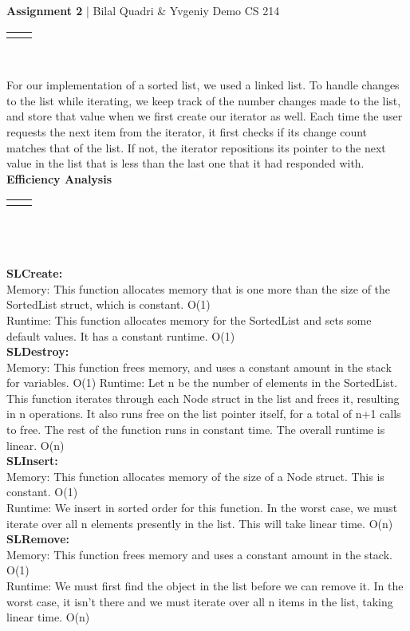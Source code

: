 \documentclass[10pt]{article}
\renewcommand{\title}[1]{\textbf{#1}}
\renewcommand{\line}{\begin{tabularx}{\textwidth}{X>{\raggedleft}X}\hline\\\end{tabularx}\\[-0.9cm]}
\begin{document}
\title{Assignment 2} |  Bilal Quadri \& Yvgeniy Demo
\hfill CS 214
\line
\setlength{\parindent}{14pt} %

For our implementation of a sorted list, we used a linked list. To handle changes to the list while iterating, we keep track of the number changes made to the list, and store that value when we first create our iterator as well. Each time the user requests the next item from the iterator, it first checks if its change count matches that of the list. If not, the iterator repositions its pointer to the next value in the list that is less than the last one that it had responded with. \\

\setlength{\parindent}{0pt} %
\textbf{Efficiency Analysis}\\
\line
\\\\
\textbf{SLCreate:}\\
Memory: This function allocates memory that is  one more than the size of the SortedList struct, which is constant. O(1)\\
Runtime: This function allocates memory for the SortedList and sets some default values. It has a constant runtime. O(1)
\\
\textbf{SLDestroy:}\\
Memory: This function frees memory, and uses a constant amount in the stack for variables. O(1)
Runtime: Let n be the number of elements in the SortedList. This function iterates through each Node struct in the list and frees it, resulting in n operations. It also runs free on the list pointer itself, for a total of n+1 calls to free. The rest of the function runs in constant time. The overall runtime is linear. O(n)
\\
\textbf{SLInsert:}\\
Memory: This function allocates memory of the size of a Node struct. This is constant. O(1)\\
Runtime: We insert in sorted order for this function. In the worst case, we must iterate over all n elements presently in the list. This will take linear time. O(n)
\\
\textbf{SLRemove:}\\
Memory: This function frees memory and uses a constant amount in the stack. O(1)\\
Runtime: We must first find the object in the list before we can remove it. In the worst case, it isn't there and we must iterate over all n items in the list, taking linear time. O(n)
\end{document}
